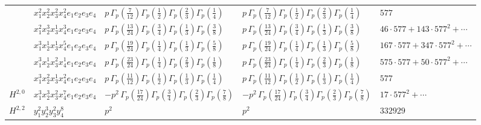 \documentclass[11pt]{article}
\begin{document}
\begin{table}[ht]
{\begin{tabular}{@{}lllll@{}}
 & $x_{1}^{2} x_{2}^{2} x_{3}^{2} x_{4}^{2}  e_{1} e_{2} e_{3} e_{4}$ & $p \, \Gamma_p \left( \frac{7}{12} \right) \Gamma_p \left( \frac{1}{2} \right) \Gamma_p \left( \frac{2}{3} \right) \Gamma_p \left( \frac{1}{4} \right)$ & $p \, \Gamma_p \left( \frac{7}{12} \right) \Gamma_p \left( \frac{1}{2} \right) \Gamma_p \left( \frac{2}{3} \right) \Gamma_p \left( \frac{1}{4} \right)$ & $577$ \\
 & $x_{1}^{2} x_{2}^{3} x_{3}^{1} x_{4}^{3}  e_{1} e_{2} e_{3} e_{4}$ & $p \, \Gamma_p \left( \frac{13}{24} \right) \Gamma_p \left( \frac{3}{4} \right) \Gamma_p \left( \frac{1}{3} \right) \Gamma_p \left( \frac{3}{8} \right)$ & $p \, \Gamma_p \left( \frac{13}{24} \right) \Gamma_p \left( \frac{3}{4} \right) \Gamma_p \left( \frac{1}{3} \right) \Gamma_p \left( \frac{3}{8} \right)$ & $46{\cdot}577{+}143{\cdot}577^{2}{+}\cdots$ \\
 & $x_{1}^{3} x_{2}^{1} x_{3}^{1} x_{4}^{5}  e_{1} e_{2} e_{3} e_{4}$ & $p \, \Gamma_p \left( \frac{19}{24} \right) \Gamma_p \left( \frac{1}{4} \right) \Gamma_p \left( \frac{1}{3} \right) \Gamma_p \left( \frac{5}{8} \right)$ & $p \, \Gamma_p \left( \frac{19}{24} \right) \Gamma_p \left( \frac{1}{4} \right) \Gamma_p \left( \frac{1}{3} \right) \Gamma_p \left( \frac{5}{8} \right)$ & $167{\cdot}577{+}347{\cdot}577^{2}{+}\cdots$ \\
 & $x_{1}^{3} x_{2}^{1} x_{3}^{2} x_{4}^{1}  e_{1} e_{2} e_{3} e_{4}$ & $p \, \Gamma_p \left( \frac{23}{24} \right) \Gamma_p \left( \frac{1}{4} \right) \Gamma_p \left( \frac{2}{3} \right) \Gamma_p \left( \frac{1}{8} \right)$ & $p \, \Gamma_p \left( \frac{23}{24} \right) \Gamma_p \left( \frac{1}{4} \right) \Gamma_p \left( \frac{2}{3} \right) \Gamma_p \left( \frac{1}{8} \right)$ & $575{\cdot}577{+}50{\cdot}577^{2}{+}\cdots$ \\
 & $x_{1}^{3} x_{2}^{2} x_{3}^{1} x_{4}^{2}  e_{1} e_{2} e_{3} e_{4}$ & $p \, \Gamma_p \left( \frac{11}{12} \right) \Gamma_p \left( \frac{1}{2} \right) \Gamma_p \left( \frac{1}{3} \right) \Gamma_p \left( \frac{1}{4} \right)$ & $p \, \Gamma_p \left( \frac{11}{12} \right) \Gamma_p \left( \frac{1}{2} \right) \Gamma_p \left( \frac{1}{3} \right) \Gamma_p \left( \frac{1}{4} \right)$ & $577$ \\
\midrule
$H^{2,0}$ & $x_{1}^{3} x_{2}^{3} x_{3}^{2} x_{4}^{7}  e_{1} e_{2} e_{3} e_{4}$ & $- p^{2} \, \Gamma_p \left( \frac{17}{24} \right) \Gamma_p \left( \frac{3}{4} \right) \Gamma_p \left( \frac{2}{3} \right) \Gamma_p \left( \frac{7}{8} \right)$ & $- p^{2} \, \Gamma_p \left( \frac{17}{24} \right) \Gamma_p \left( \frac{3}{4} \right) \Gamma_p \left( \frac{2}{3} \right) \Gamma_p \left( \frac{7}{8} \right)$ & $17{\cdot}577^{2}{+}\cdots$ \\
\midrule
$H^{2,2}$ & $y_{1}^{2} y_{2}^{3} y_{3}^{2} y_{4}^{8}$ & $p^{2} \,$ & $p^{2} \,$ & $332929$ \\
\bottomrule
\end{tabular}
}
\renewcommand{\arraystretch}{1.0}
\end{table}
\end{document}
